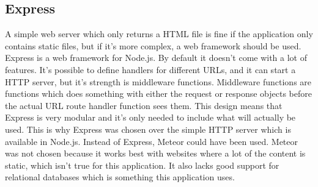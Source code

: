 \subsection{Express}
A simple web server which only returns a HTML file is fine if the application only contains static files, but if it's more complex, a web framework should be used. Express is a web framework for Node.js. By default it doesn't come with a lot of features. It's possible to define handlers for different URLs, and it can start a HTTP server, but it's strength is middleware functions. Middleware functions are functions which does something with either the request or response objects before the actual URL route handler function sees them. This design means that Express is very modular and it's only needed to include what will actually be used. This is why Express was chosen over the simple HTTP server which is available in Node.js. Instead of Express, Meteor could have been used. Meteor was not chosen because it works best with websites where a lot of the content is static, which isn't true for this application. It also lacks good support for relational databases which is something this application uses.

